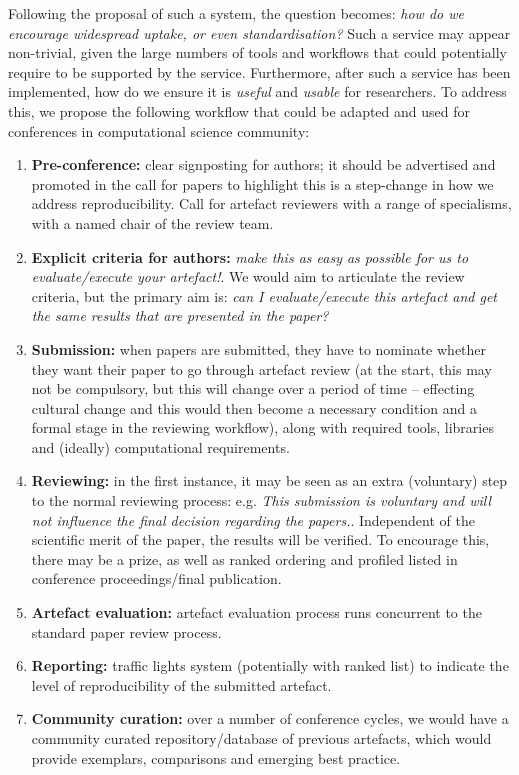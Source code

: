 \documentclass[conference]{IEEEtran}
\begin{document}
Following the proposal of such a system, the question becomes:
{\emph{how do we encourage widespread uptake, or even
    standardisation?}}  Such a service may appear non-trivial, given
the large numbers of tools and workflows that could potentially
require to be supported by the service. Furthermore, after such a
service has been implemented, how do we ensure it is \emph{useful} and
\emph{usable} for researchers. To address this, we propose the
following workflow that could be adapted and used for conferences in computational
science community:

\begin{enumerate}
\item {\textbf{Pre-conference:}} clear signposting for authors; it
should be advertised and promoted in the call for papers to
highlight this is a step-change in how we address
reproducibility. Call for artefact reviewers with a range of
specialisms, with a named chair of the review team.
\item {\textbf{Explicit criteria for authors:}} {\emph{make this as
easy as possible for us to evaluate/execute your artefact!}}. We would
aim to articulate the review criteria, but the primary aim is:
{\emph{can I evaluate/execute this artefact and get the same results
that are presented in the paper?}}
\item {\textbf{Submission:}} when papers are submitted, they have to
nominate whether they want their paper to go through artefact review
(at the start, this may not be compulsory, but this will change over a
period of time -- effecting cultural change and this would then become
a necessary condition and a formal stage in the reviewing workflow),
along with required tools, libraries and (ideally) computational
requirements.
\item {\textbf{Reviewing:}} in the first instance, it may be seen as
an extra (voluntary) step to the normal reviewing process:
e.g. {\emph{This submission is voluntary and will not influence the
final decision regarding the papers.}}. Independent of the scientific
merit of the paper, the results will be verified. To encourage this,
there may be a prize, as well as ranked ordering and profiled listed
in conference proceedings/final publication.
\item {\textbf{Artefact evaluation:}} artefact evaluation process runs
concurrent to the standard paper review process.
\item {\textbf{Reporting:}} traffic lights system (potentially with
ranked list) to indicate the level of reproducibility of the submitted
artefact.
\item {\textbf{Community curation:}} over a number of conference
  cycles, we would have a community curated repository/database of
  previous artefacts, which would provide exemplars, comparisons and
  emerging best practice.
\end{enumerate}
\end{document}
